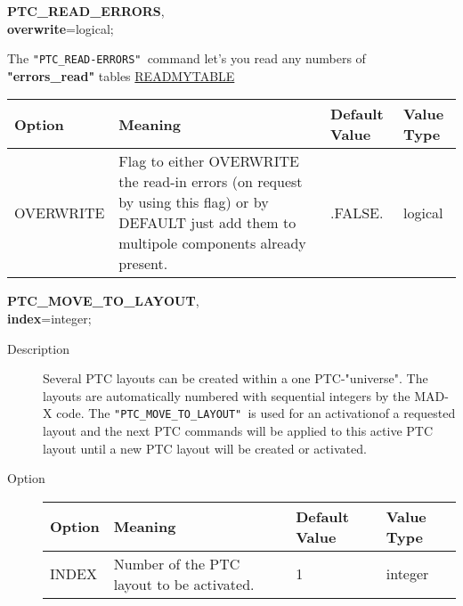\begin{description}
	\item {\textbf{PTC\_READ\_ERRORS}, \\ \textbf{overwrite}=logical;} 
	
	\item[Description] The \texttt{"PTC\_READ-ERRORS" }command let's you read any numbers of  \textbf{"errors\_read"} tables  \href{../control/general.html#readmytable}{READMYTABLE}
	\item[Options] 
	\text{ \\}	%
	
\begin{tabular}{l p{6cm} p{1.5cm} p{1.5cm}}
\hline 
\textbf{Option} & \textbf{Meaning} & \textbf{Default Value} & \textbf{Value Type} \\ 
\hline
OVERWRITE & 
Flag to either OVERWRITE the read-in errors (on request by using this flag) or by DEFAULT just add them to multipole components already present.   & .FALSE. & logical \\ 
\hline
\end{tabular}

	\item[Remarks] 
    
    \item {\textbf{PTC\_MOVE\_TO\_LAYOUT}, \\ \textbf{index}=integer;}
\end{description}

\begin{description}
	\item[Description]  Several PTC layouts can be created within a one PTC-"universe".  The layouts are automatically numbered with sequential integers  by the MAD-X code. The \texttt{"PTC\_MOVE\_TO\_LAYOUT" }is used for an activation\nolinebreak of a requested  layout and the next PTC commands will be applied to this active  PTC layout until a new PTC layout will be created or activated.
	\item[Option] 
	\text{ \\}	%
	
\begin{tabular}{l p{6cm} p{1.5cm} p{1.5cm}}
\hline 
\textbf{Option} & \textbf{Meaning} & \textbf{Default Value} & \textbf{Value Type} \\ 
\hline
INDEX & Number of the PTC layout to be activated. & 1 & integer \\ 
\hline
\end{tabular}

\end{description}

